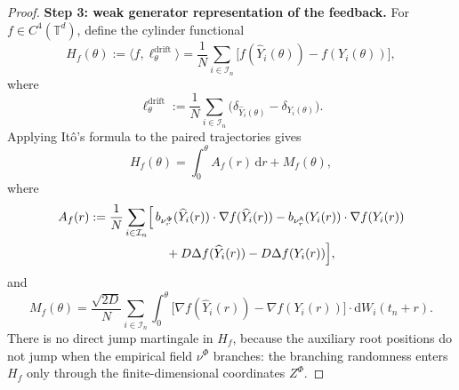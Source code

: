 \documentclass[a4paper,fleqn]{cas-sc}
\theoremstyle{definition}
\theoremstyle{remark}
\begin{document}
\begin{proof}
\medskip
\noindent\textbf{Step 3: weak generator representation of the feedback.}
For $f\in C^4(\mathbb T^d)$, define the cylinder functional
\[
H_f(\theta):=\bigl\langle f,\ell^{\mathrm{drift}}_\theta\bigr\rangle
=\frac1N\sum_{i\in\mathcal I_n}\bigl[f(\widehat Y_i(\theta))-f(Y_i(\theta))\bigr],
\]
where
\[
\ell^{\mathrm{drift}}_\theta:=\frac1N\sum_{i\in\mathcal I_n}\bigl(\delta_{\widehat Y_i(\theta)}-\delta_{Y_i(\theta)}\bigr).
\]
Applying It\^o's formula to the paired trajectories gives
\begin{equation}\label{eq:L4-ito}
H_f(\theta)=\int_0^\theta A_f(r)\,\mathrm dr+M_f(\theta),
\end{equation}
where
\begin{equation}\label{eq:L4-Af}
\begin{aligned}
A_f(r):=\frac1N\sum_{i\in\mathcal I_n}\Bigl[
&\,b_{\nu^\Phi_r}(\widehat Y_i(r))\cdot\nabla f(\widehat Y_i(r))
-b_{\nu^{\mathsf A}_r}(Y_i(r))\cdot\nabla f(Y_i(r))\\
&\quad+D\Delta f(\widehat Y_i(r))-D\Delta f(Y_i(r))\Bigr],
\end{aligned}
\end{equation}
and
\[
M_f(\theta)=\frac{\sqrt{2D}}{N}\sum_{i\in\mathcal I_n}\int_0^\theta
\bigl[\nabla f(\widehat Y_i(r))-\nabla f(Y_i(r))\bigr]\cdot\mathrm dW_i(t_n+r).
\]
There is no direct jump martingale in $H_f$, because the auxiliary root positions do not
jump when the empirical field $\nu^\Phi$ branches: the branching randomness enters $H_f$
only through the finite-dimensional coordinates $Z^\Phi$.


\end{proof}
\end{document}
